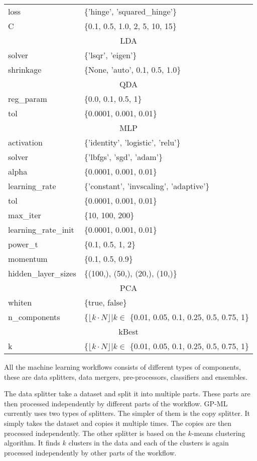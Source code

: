 \documentclass{ws-ijait}
\begin{document}
\begin{table}[p]
{\begin{tabular}{ll}
\hline
loss & \{'hinge', 'squared\_hinge'\} \\
C & \{0.1, 0.5, 1.0, 2, 5, 10, 15\} \\
\hline
\multicolumn{2}{c}{LDA} \\
\hline
solver & \{'lsqr', 'eigen'\} \\
shrinkage & \{None, 'auto', 0.1, 0.5, 1.0\} \\
\hline
\multicolumn{2}{c}{QDA} \\
\hline
reg\_param & \{0.0, 0.1, 0.5, 1\} \\
tol & \{0.0001, 0.001, 0.01\} \\
\hline
\multicolumn{2}{c}{MLP} \\
\hline
activation & \{'identity', 'logistic', 'relu'\} \\
solver & \{'lbfgs', 'sgd', 'adam'\} \\
alpha & \{0.0001, 0.001, 0.01\} \\
learning\_rate & \{'constant', 'invscaling', 'adaptive'\} \\
tol & \{0.0001, 0.001, 0.01\} \\
max\_iter & \{10, 100, 200\} \\
learning\_rate\_init & \{0.0001, 0.001, 0.01\} \\
power\_t & \{0.1, 0.5, 1, 2\} \\
momentum & \{0.1, 0.5, 0.9\} \\
hidden\_layer\_sizes & \{(100,), (50,), (20,), (10,)\} \\ 
\hline
\multicolumn{2}{c}{PCA} \\
\hline
whiten & \{true, false\} \\     
n\_components & \{$\lfloor k \cdot N \rfloor | k \in$ \{0.01, 0.05, 0.1, 0.25, 0.5, 0.75, 1\} \\
\hline
\multicolumn{2}{c}{kBest} \\
\hline
k & \{$\lfloor k \cdot N \rfloor | k \in$ \{0.01, 0.05, 0.1, 0.25, 0.5, 0.75, 1\} \\
\hline
\end{tabular}}
\end{table} 

All the machine learning workflows consists of different types of components,
these are data splitters, data mergers, pre-processors, classifiers and
ensembles. 

The data splitter take a dataset and split it into multiple parts. These parts
are then processed independently by different parts of the workflow. GP-ML
currently uses two types of splitters. The simpler of them is the copy splitter.
It simply takes the dataset and copies it multiple times. The copies are then
processed independently. The other splitter is based on the $k$-means clustering
algorithm. It finds $k$ clusters in the data and each of the clusters is again 
processed independently by other parts of the workflow.
\end{document}

